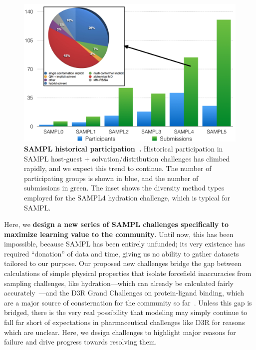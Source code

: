 \documentclass[11pt]{article}
\begin{document}
\begin{figure}
\begin{centering}
\includegraphics[width=\textwidth]{figures/history_v0.pdf}

\end{centering}
\footnotesize
\caption{\label{figure:sampl5_logD}  
\textbf{SAMPL historical participation~\cite{mobley_blind_2014-1}.} 
Historical participation in SAMPL host-guest + solvation/distribution challenges has climbed rapidly, and we expect this trend to continue. The number of participating groups is shown in blue, and the number of submissions in green. The inset shows the diversity method types employed for the SAMPL4 hydration challenge, which is typical for SAMPL. 
}
\end{figure}

Here, we \textbf{design a new series of SAMPL challenges specifically to maximize learning value to the community}.
Until now, this has been impossible, because SAMPL has been entirely unfunded; its very existence has required ``donation'' of data and time, giving us no ability to gather datasets tailored to our purpose. 
Our proposed new challenges bridge the gap between calculations of simple physical properties that isolate forcefield inaccuracies from sampling challenges, like hydration---which can already be calculated fairly accurately~\cite{mobley_blind_2014-1}---and the D3R Grand Challenges on protein-ligand binding, which are a major source of consternation for the community so far~\cite{ignjatovic_binding-affinity_2016, deng_large_2016, sunseri_d3r_2016, gathiaka_d3r_2016}.
Unless this gap is bridged, there is the very real possibility that modeling may simply continue to fall far short of expectations in pharmaceutical challenges like D3R for reasons which are unclear.
Here, we design challenges to highlight major reasons for failure and drive progress towards resolving them.
\end{document}
